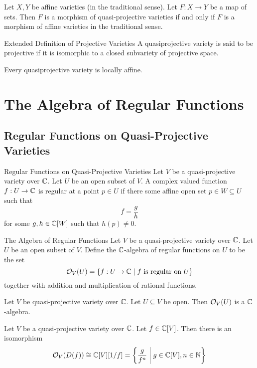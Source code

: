 \documentclass[a4paper]{article}
\begin{document}
\begin{prp}{}{} Let $X,Y$ be affine varieties (in the traditional sense). Let $F:X\to Y$ be a map of sets. Then $F$ is a morphism of quasi-projective varieties if and only if $F$ is a morphism of affine varieties in the traditional sense. 
\end{prp}

\begin{defn}{Extended Definition of Projective Varieties}{} A quasiprojective variety is said to be projective if it is isomorphic to a closed subvariety of projective space. 
\end{defn}

\begin{prp}{}{} Every quasiprojective variety is locally affine. 
\end{prp}

\pagebreak
\section{The Algebra of Regular Functions}
\subsection{Regular Functions on Quasi-Projective Varieties}
\begin{defn}{Regular Functions on Quasi-Projective Varieties}{} Let $V$ be a quasi-projective variety over $\mathbb{C}$. Let $U$ be an open subset of $V$. A complex valued function $f:U\to\mathbb{C}$ is regular at a point $p\in U$ if there some affine open set $p\in W\subseteq U$ such that $$f=\frac{g}{h}$$ for some $g,h\in\mathbb{C}[W]$ such that $h(p)\neq 0$. 
\end{defn}

\begin{defn}{The Algebra of Regular Functions}{} Let $V$ be a quasi-projective variety over $\mathbb{C}$. Let $U$ be an open subset of $V$. Define the $\mathbb{C}$-algebra of regular functions on $U$ to be the set $$\mathcal{O}_V(U)=\{f:U\to\mathbb{C}\;|\;f\text{ is regular on }U\}$$ together with addition and multiplication of rational functions. 
\end{defn}

\begin{lmm}{}{} Let $V$ be quasi-projective variety over $\mathbb{C}$. Let $U\subseteq V$ be open. Then $\mathcal{O}_V(U)$ is a $\mathbb{C}$-algebra. 
\end{lmm}

\begin{prp}{}{} Let $V$ be a quasi-projective variety over $\mathbb{C}$. Let $f\in\mathbb{C}[V]$. Then there is an isomorphism $$\mathcal{O}_V(D(f))\cong\mathbb{C}[V][1/f]=\left\{\frac{g}{f^n}\;\bigg{|}\;g\in\mathbb{C}[V],n\in\mathbb{N}\right\}$$
\end{prp}
\end{document}
